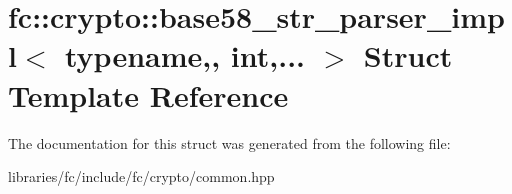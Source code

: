 \hypertarget{structfc_1_1crypto_1_1base58__str__parser__impl}{}\section{fc\+:\+:crypto\+:\+:base58\+\_\+str\+\_\+parser\+\_\+impl$<$ typename,, int,... $>$ Struct Template Reference}
\label{structfc_1_1crypto_1_1base58__str__parser__impl}


The documentation for this struct was generated from the following file\+:\begin{DoxyCompactItemize}
\item 
libraries/fc/include/fc/crypto/common.\+hpp\end{DoxyCompactItemize}
